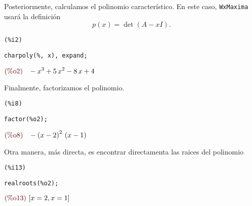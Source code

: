 \begin{solucion}
Posteriormente, calculamos el polinomio característico. En este caso, \texttt{WxMaxima} usará la definición $$
p(x)=\det\left( A-xI \right).
$$
\noindent
%
\begin{minipage}{8ex}{\color{red}\bf
\begin{verbatim}
(%i2)
\end{verbatim}}
\end{minipage}
\begin{minipage}{\textwidth}{\color{blue}
\begin{verbatim}
charpoly(%, x), expand;
\end{verbatim}}
\end{minipage}
\begin{math}\displaystyle
\parbox{8ex}{\color{labelcolor}(\%o2) }
-{x}^{3}+5\,{x}^{2}-8\,x+4
\end{math}
%

Finalmente, factorizamos el polinomio.
\noindent
%
\begin{minipage}{8ex}{\color{red}\bf
\begin{verbatim}
(%i8)
\end{verbatim}}
\end{minipage}
\begin{minipage}{\textwidth}{\color{blue}
\begin{verbatim}
factor(%o2);
\end{verbatim}}
\end{minipage}
\begin{math}\displaystyle
\parbox{8ex}{\color{labelcolor}(\%o8) }
-{\left( x-2\right) }^{2}\,\left( x-1\right)
\end{math}
%

Otra manera, más directa, es encontrar directamenta las raices del polinomio

\noindent
%
\begin{minipage}{8ex}{\color{red}\bf
\begin{verbatim}
(%i13)
\end{verbatim}}
\end{minipage}
\begin{minipage}{\textwidth}{\color{blue}
\begin{verbatim}
realroots(%o2);
\end{verbatim}}
\end{minipage}
\begin{math}\displaystyle
\parbox{8ex}{\color{labelcolor}(\%o13) }
[x=2,x=1]
\end{math}
%


\end{solucion}
